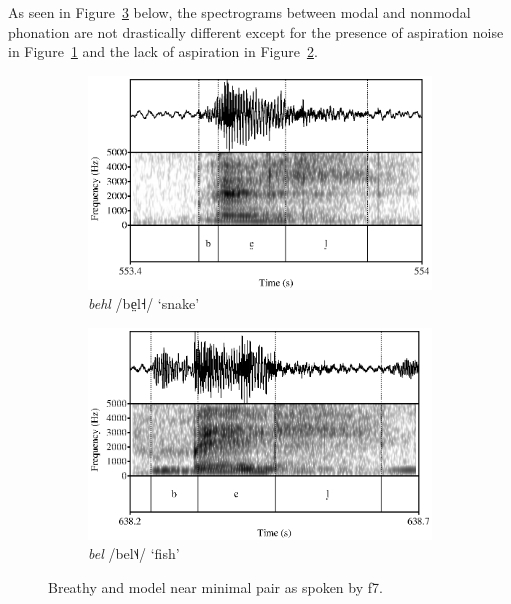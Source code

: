 As seen in Figure~\ref{fig:f7breathy_model} below, the spectrograms between modal and nonmodal phonation are not drastically different except for the presence of aspiration noise in Figure~\ref{fig:f7behl} and the lack of aspiration in Figure~\ref{fig:f7bel}. 

\begin{figure}[h!]
	\centering
	\begin{subfigure}{.5\textwidth}
		\centering
		\includegraphics[width=\linewidth]{images/f7_behl_isolation.eps}
		\caption{\textit{behl} /be̤l˧/ `snake'}
		\label{fig:f7behl}
	\end{subfigure}%
	\begin{subfigure}{.5\textwidth}
		\centering
		\includegraphics[width=\linewidth]{images/f7_bel_isolation.eps}
		\caption{\textit{bel} /bel˦˨/ `fish'}
		\label{fig:f7bel}
	\end{subfigure}
	\caption{Breathy and model near minimal pair as spoken by f7.}
	\label{fig:f7breathy_model}
\end{figure}

